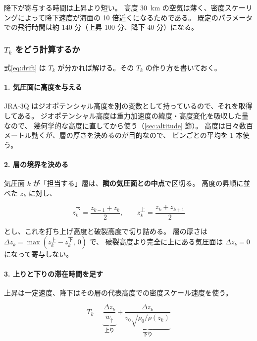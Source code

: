 降下が寄与する時間は上昇より短い。
高度 \SI{30}{\kilo\metre} の空気は薄く、密度スケーリングによって降下速度が海面の 10 倍近くになるためである。
既定のパラメータでの飛行時間は約 \num{140} 分（上昇 100 分、降下 40 分）になる。

\subsubsection{\texorpdfstring{$T_k$}{T\_k} をどう計算するか}
\label{sec:drift-layers}

式\eqref{eq:drift} は $T_k$ が分かれば解ける。その $T_k$ の作り方を書いておく。

\paragraph{1. 気圧面に高度を与える}
JRA-3Q はジオポテンシャル高度を別の変数として持っているので、それを取得してある。
ジオポテンシャル高度は重力加速度の緯度・高度変化を吸収した量なので、
幾何学的な高度に直してから使う（\ref{sec:altitude} 節）。
高度は日々数百メートル動くが、層の厚さを決めるのが目的なので、
ビンごとの平均を 1 本使う。

\paragraph{2. 層の境界を決める}
気圧面 $k$ が「担当する」層は、\textbf{隣の気圧面との中点}で区切る。
高度の昇順に並べた $z_k$ に対し、

\begin{equation}
  z_k^{\text{下}} = \frac{z_{k-1} + z_k}{2}, \qquad
  z_k^{\text{上}} = \frac{z_k + z_{k+1}}{2}
  \label{eq:layer-edges}
\end{equation}

とし、これを打ち上げ高度と破裂高度で切り詰める。
層の厚さは $\Delta z_k = \max(z_k^{\text{上}} - z_k^{\text{下}},\, 0)$ で、
破裂高度より完全に上にある気圧面は $\Delta z_k = 0$ になって寄与しない。

\paragraph{3. 上りと下りの滞在時間を足す}
上昇は一定速度、降下はその層の代表高度での密度スケール速度を使う。

\begin{equation}
  T_k = \underbrace{\frac{\Delta z_k}{w_{\uparrow}}}_{\text{上り}}
      + \underbrace{\frac{\Delta z_k}{v_0\sqrt{\rho_0/\rho(z_k)}}}_{\text{下り}}
  \label{eq:layer-seconds}
\end{equation}

